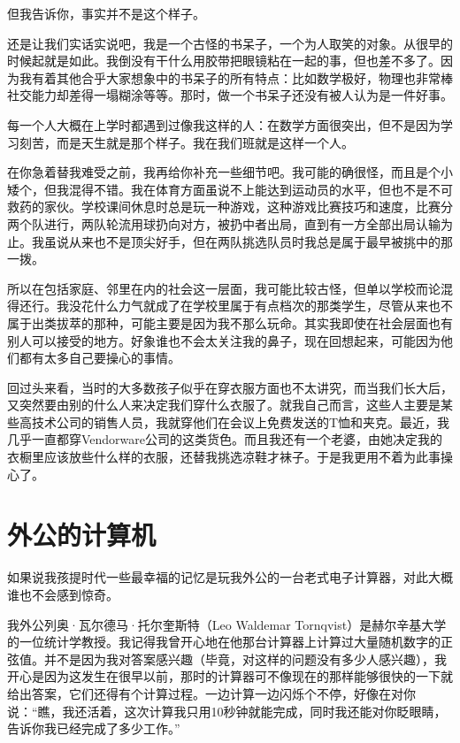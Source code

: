 但我告诉你，事实并不是这个样子。

还是让我们实话实说吧，我是一个古怪的书呆子，一个为人取笑的对象。从很早的时候起就是如此。我倒没有干什么用胶带把眼镜粘在一起的事，但也差不多了。因为我有着其他合乎大家想象中的书呆子的所有特点：比如数学极好，物理也非常棒社交能力却差得一塌糊涂等等。那时，做一个书呆子还没有被人认为是一件好事。

每一个人大概在上学时都遇到过像我这样的人：在数学方面很突出，但不是因为学习刻苦，而是天生就是那个样子。我在我们班就是这样一个人。

在你急着替我难受之前，我再给你补充一些细节吧。我可能的确很怪，而且是个小矮个，但我混得不错。我在体育方面虽说不上能达到运动员的水平，但也不是不可救药的家伙。学校课间休息时总是玩一种游戏，这种游戏比赛技巧和速度，比赛分两个队进行，两队轮流用球扔向对方，被扔中者出局，直到有一方全部出局认输为止。我虽说从来也不是顶尖好手，但在两队挑选队员时我总是属于最早被挑中的那一拨。

所以在包括家庭、邻里在内的社会这一层面，我可能比较古怪，但单以学校而论混得还行。我没花什么力气就成了在学校里属于有点档次的那类学生，尽管从来也不属于出类拔萃的那种，可能主要是因为我不那么玩命。其实我即使在社会层面也有别人可以接受的地方。好象谁也不会太关注我的鼻子，现在回想起来，可能因为他们都有太多自己要操心的事情。

回过头来看，当时的大多数孩子似乎在穿衣服方面也不太讲究，而当我们长大后，又突然要由别的什么人来决定我们穿什么衣服了。就我自己而言，这些人主要是某些高技术公司的销售人员，我就穿他们在会议上免费发送的T恤和夹克。最近，我几乎一直都穿Vendorware公司的这类货色。而且我还有一个老婆，由她决定我的衣橱里应该放些什么样的衣服，还替我挑选凉鞋才袜子。于是我更用不着为此事操心了。

 

 
\section{外公的计算机}

如果说我孩提时代一些最幸福的记忆是玩我外公的一台老式电子计算器，对此大概谁也不会感到惊奇。

我外公列奥·瓦尔德马·托尔奎斯特（Leo Waldemar Tornqvist）是赫尔辛基大学的一位统计学教授。我记得我曾开心地在他那台计算器上计算过大量随机数字的正弦值。并不是因为我对答案感兴趣（毕竟，对这样的问题没有多少人感兴趣），我开心是因为这发生在很早以前，那时的计算器可不像现在的那样能够很快的一下就给出答案，它们还得有个计算过程。一边计算一边闪烁个不停，好像在对你说：“瞧，我还活着，这次计算我只用10秒钟就能完成，同时我还能对你眨眼睛，告诉你我已经完成了多少工作。”

